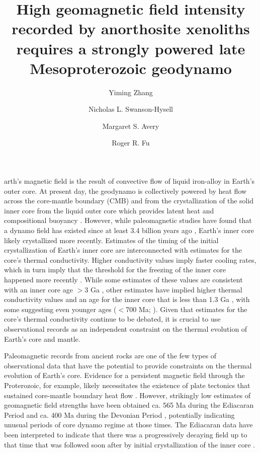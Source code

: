 \documentclass[9pt,twocolumn,twoside,lineno]{pnas-new}
\title{High geomagnetic field intensity recorded by anorthosite xenoliths requires a strongly powered late Mesoproterozoic geodynamo}
\author[a,1]{Yiming Zhang}
\author[a]{Nicholas L. Swanson-Hysell}
\author[a,b]{Margaret S. Avery}
\author[c]{Roger R. Fu}
\affil[a]{Department of Earth and Planetary Science, University of California, Berkeley, CA, 94720}
\affil[b]{Geology, Minerals, Energy, and Geophysics Science Center, U.S. Geological Survey, Moffett Field, CA, 94025}
\affil[c]{Department of Earth and Planetary Sciences, Harvard University, Cambridge, MA, 02138}
\begin{document}
\maketitle
\thispagestyle{firststyle}

arth's magnetic field is the result of convective flow of liquid iron-alloy in Earth's outer core. At present day, the geodynamo is collectively powered by heat flow across the core-mantle boundary (CMB) and from the crystallization of the solid inner core from the liquid outer core which provides latent heat and compositional buoyancy \cite{Buffett2000a}. However, while paleomagnetic studies have found that a dynamo field has existed since at least 3.4 billion years ago \cite{Selkin2007a, Tarduno2014a, Brenner2020a}, Earth's inner core likely crystallized more recently. Estimates of the timing of the initial crystallization of Earth's inner core are interconnected with estimates for the core's thermal conductivity. Higher conductivity values imply faster cooling rates, which in turn imply that the threshold for the freezing of the inner core happened more recently \cite{Davies2015a}. While some estimates of these values are consistent with an inner core age $>$3 Ga \cite{Gubbins2004a, Konopkova2016a}, other estimates have implied higher thermal conductivity values and an age for the inner core that is less than 1.3 Ga \cite{Pozzo2012a, Koker2012a, Gomi2013a, Zhang2020b}, with some suggesting even younger ages ($<$700 Ma;  \citealp{Labrosse2015a, Ohta2016a}). Given that estimates for the core's thermal conductivity continue to be debated, it is crucial to use observational records as an independent constraint on the thermal evolution of Earth's core and mantle.

Paleomagnetic records from ancient rocks are one of the few types of observational data that have the potential to provide constraints on the thermal evolution of Earth’s core. Evidence for a persistent magnetic field through the Proterozoic, for example, likely necessitates the existence of plate tectonics that sustained core-mantle boundary heat flow \cite{Swanson-Hysell2021c}. However, strikingly low estimates of geomagnetic field strengths have been obtained ca. 565 Ma during the Ediacaran Period \cite{Bono2019a, Shcherbakova2019a,Thallner2021b} and ca. 400 Ma during the Devonian Period \cite{Shcherbakova2017a, Shcherbakova2021a, Hawkins2021a}, potentially indicating unusual periods of core dynamo regime at those times. The Ediacaran data have been interpreted to indicate that there was a progressively decaying field up to that time that was followed soon after by initial crystallization of the inner core \cite{Bono2019a}.
\end{document}
